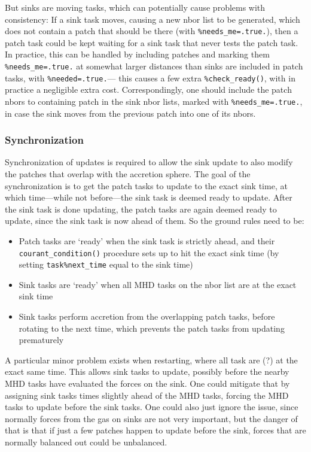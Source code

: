 \documentclass[paper=a4,fontsize=11pt]{scrartcl}
\numberwithin{equation}{section}		%
\numberwithin{figure}{section}			%
\numberwithin{table}{section}				%
\begin{document}
But sinks are moving tasks, which can potentially cause problems with consistency:  If a sink task moves, causing a new nbor list to be generated, which does not contain a patch that should be there (with \verb|%needs_me=.true.|), then a patch task could be kept waiting for a sink task that never tests the patch task.  In practice, this can be handled by including patches and marking them \verb|%needs_me=.true.| at somewhat larger distances than sinks are included in patch tasks, with \verb|%needed=.true.|--- this causes a few extra \verb|%check_ready()|, with in practice a negligible extra cost.   Correspondingly, one should include the patch nbors to containing patch in the sink nbor lists, marked with \verb|%needs_me=.true.|, in case the sink moves from the previous patch into one of its nbors.

\subsubsection{Synchronization}
Synchronization of updates is required to allow the sink update to also modify the patches that overlap with the accretion sphere.  The goal of the synchronization is to get the patch tasks to update to the exact sink time, at which time---while not before---the sink task is deemed ready to update.  After the sink task is done updating, the patch tasks are again deemed ready to update, since the sink task is now ahead of them.  So the ground rules need to be:
\begin{itemize}
    \item Patch tasks are `ready' when the sink task is strictly ahead, and their \verb|courant_condition()| procedure sets up to hit the exact sink time (by setting \verb|task%next_time| equal to the sink time)
    \item Sink tasks are `ready' when all MHD tasks on the nbor list are at the exact sink time
    \item Sink tasks perform accretion from the overlapping patch tasks, before rotating to the next time, which prevents the patch tasks from updating prematurely
\end{itemize}
A particular minor problem exists when restarting, where all task are (?) at the exact same time.  This allows sink tasks to update, possibly before the nearby MHD tasks have evaluated the forces on the sink.  One could mitigate that by assigning sink tasks times slightly ahead of the MHD tasks, forcing the MHD tasks to update before the sink tasks.  One could also just ignore the issue, since normally forces from the gas on sinks are not very important, but the danger of that is that if just a few patches happen to update before the sink, forces that are normally balanced out could be unbalanced.
\end{document}
